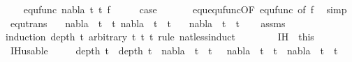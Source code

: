 \begin{isabellebody}
\isanewline
\ \ \isamarkupfalse%
\ {\isacharparenleft}{\kern0pt}equ{\isacharunderscore}{\kern0pt}func\ nabla\ t{}{\isacharprime}{\kern0pt}\ t{}{\isacharprime}{\kern0pt}\ f{\isacharparenright}{\kern0pt}\isanewline
\ \ \isamarkupfalse%
\ \isamarkupfalse%
\ {\isacharquery}{\kern0pt}case\ \isanewline
\ \ \ \ \isamarkupfalse%
\ equ{\isachardot}{\kern0pt}equ{\isacharunderscore}{\kern0pt}func{\isacharbrackleft}{\kern0pt}OF\ equ{\isacharunderscore}{\kern0pt}func{\isacharparenleft}{\kern0pt}{}{\isacharparenright}{\kern0pt}{\isacharcomma}{\kern0pt}\ of\ f{\isacharbrackright}{\kern0pt}\ \isamarkupfalse%
\ simp\isanewline
{}\isamarkupfalse%
%
\endisatagproof
{\isafoldproof}%
%
\isadelimproof
\isanewline
%
\endisadelimproof
\isanewline
\isanewline
{}\isamarkupfalse%
\ equ{\isacharunderscore}{\kern0pt}trans{\isacharcolon}{\kern0pt}\isanewline
\ \ \ {\isachardoublequoteopen}nabla\ {\isasymturnstile}\ t{}\ {\isasymapprox}\ t{}{\isachardoublequoteclose}\ {\isachardoublequoteopen}nabla\ {\isasymturnstile}\ t{}\ {\isasymapprox}\ t{}{\isachardoublequoteclose}\isanewline
\ \ \ {\isachardoublequoteopen}nabla\ {\isasymturnstile}\ t{}\ {\isasymapprox}\ t{}{\isachardoublequoteclose}\isanewline
%
\isadelimproof
\ \ %
\endisadelimproof
%
\isatagproof
{}\isamarkupfalse%
\ assms\isanewline
{}\isamarkupfalse%
{\isacharparenleft}{\kern0pt}induction\ {\isacartoucheopen}depth\ t{}{\isacartoucheclose}\ arbitrary{\isacharcolon}{\kern0pt}\ t{}\ t{}\ t{}\ rule{\isacharcolon}{\kern0pt}\ nat{\isacharunderscore}{\kern0pt}less{\isacharunderscore}{\kern0pt}induct{\isacharparenright}{\kern0pt}\isanewline
\ \ \isamarkupfalse%
\ {}\isanewline
\ \ \isamarkupfalse%
\ IH\ {\isacharequal}{\kern0pt}\ this\isanewline
\ \ \isamarkupfalse%
\ IH{\isacharunderscore}{\kern0pt}usable{\isacharcolon}{\kern0pt}\ \isanewline
\ \ \ \ {\isachardoublequoteopen}depth\ t{}{\isacharprime}{\kern0pt}\ {\isacharless}{\kern0pt}\ depth\ t{}\ {\isasymLongrightarrow}\ nabla\ {\isasymturnstile}\ t{}{\isacharprime}{\kern0pt}\ {\isasymapprox}\ t{}{\isacharprime}{\kern0pt}\ {\isasymLongrightarrow}\ \ nabla\ {\isasymturnstile}\ t{}{\isacharprime}{\kern0pt}\ {\isasymapprox}\ t{}{\isacharprime}{\kern0pt}\ {\isasymLongrightarrow}\ nabla\ {\isasymturnstile}\ t{}{\isacharprime}{\kern0pt}\ {\isasymapprox}\ t{}{\isacharprime}{\kern0pt}{\isachardoublequoteclose}\isanewline

\end{isabellebody}
